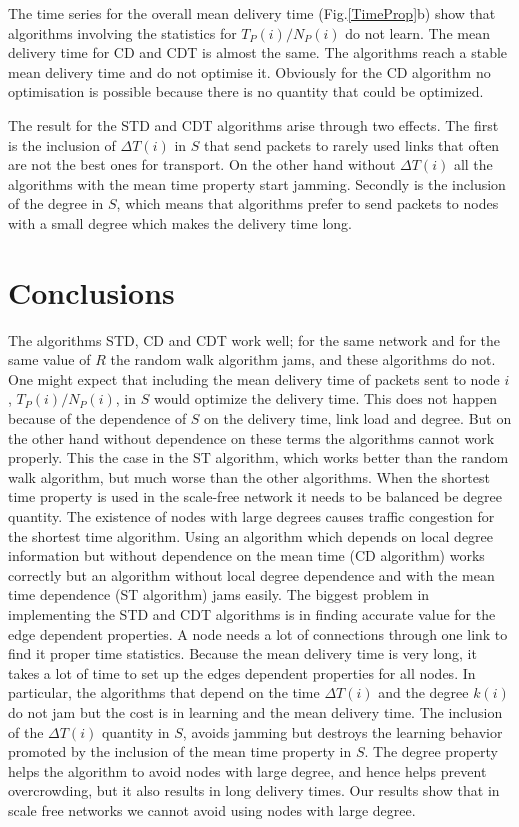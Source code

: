 \documentclass[runningheads]{llncs}
\begin{document}
The time series for the overall mean delivery time
(Fig.\ref{TimeProp}b) show that algorithms involving the statistics
for $T_P(i)/N_P(i)$ do not learn. The mean delivery time for CD and
CDT is almost the same. The algorithms reach a stable mean delivery
time and do not optimise it. Obviously for the CD algorithm no
optimisation is possible because there is no quantity that could be
optimized.

The result for the STD and CDT algorithms arise through two effects.
The first is the inclusion of $\Delta T(i)$ in $S$ that send packets
to rarely used links that often are not the best ones for transport.
On the other hand without $\Delta T(i)$ all the algorithms with the
mean time property start jamming. Secondly is the inclusion of the
degree in $S$, which means that algorithms prefer to send packets to
nodes with a small degree which makes the delivery time long.


\section{Conclusions}
The algorithms STD, CD and CDT work well; for the same network and
for the same value of $R$ the random walk algorithm jams, and these
algorithms do not. One might expect that including the mean delivery
time of packets sent to node $i$, $T_P(i)/N_P(i)$, in $S$ would
optimize the delivery time. This does not happen because of the
dependence of $S$ on the delivery time, link load and degree. But on
the other hand without dependence on these terms the algorithms
cannot work properly. This the case in the ST algorithm, which works
better than the random walk algorithm, but much worse than the other
algorithms. When the shortest time property is used in the
scale-free network it needs to be balanced be degree quantity. The
existence of nodes with large degrees causes traffic congestion for
the shortest time algorithm. Using an algorithm which depends on
local degree information but without dependence on the mean time (CD
algorithm) works correctly but an algorithm without local degree
dependence and with the mean time dependence (ST algorithm) jams
easily. The biggest problem in implementing the STD and CDT
algorithms is in finding accurate value for the edge dependent
properties. A node needs a lot of connections through one link to
find it proper time statistics. Because the mean delivery time is
very long, it takes a lot of time to set up the edges dependent
properties for all nodes. In particular, the algorithms that depend
on the time $\Delta T(i)$ and the degree $k(i)$ do not jam but the
cost is in learning and the mean delivery time. The inclusion of the
$\Delta T(i)$ quantity in $S$, avoids jamming but destroys the
learning behavior promoted by the inclusion of the mean time
property in $S$. The degree property helps the algorithm to avoid
nodes with large degree, and hence helps prevent overcrowding, but
it also results in long delivery times. Our results show that in
scale free networks we cannot avoid using nodes with large degree.
\end{document}
